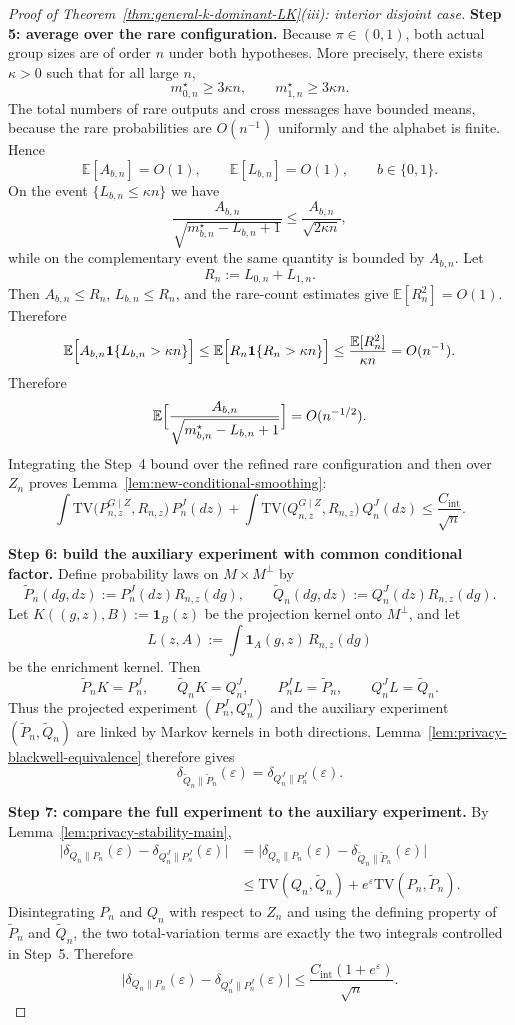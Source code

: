 \documentclass{article}
\newcommand{\TV}{\mathrm{TV}}
\newcommand{\E}{\mathbb E}
\newcommand{\1}{\mathbf 1}
\begin{document}
\begin{proof}[Proof of Theorem~\ref{thm:general-k-dominant-LK}(iii): interior disjoint case]
\medskip
\textbf{Step 5: average over the rare configuration.}
Because $\pi\in(0,1)$, both actual group sizes are of order $n$ under both hypotheses. More precisely, there exists
$\kappa>0$ such that for all large $n$,
\[
m_{0,n}^\star\ge 3\kappa n,
\qquad
m_{1,n}^\star\ge 3\kappa n.
\]
The total numbers of rare outputs and cross messages have bounded means, because the rare probabilities are
$O(n^{-1})$ uniformly and the alphabet is finite. Hence
\[
\E[A_{b,n}]=O(1),\qquad \E[L_{b,n}]=O(1),\qquad b\in\{0,1\}.
\]
On the event $\{L_{b,n}\le \kappa n\}$ we have
\[
\frac{A_{b,n}}{\sqrt{m_{b,n}^\star-L_{b,n}+1}}
\le \frac{A_{b,n}}{\sqrt{2\kappa n}},
\]
while on the complementary event the same quantity is bounded by $A_{b,n}$. Let
\[
R_n:=L_{0,n}+L_{1,n}.
\]
Then $A_{b,n}\le R_n$, $L_{b,n}\le R_n$, and the rare-count estimates give $\E[R_n^2]=O(1)$. Therefore
\[
\E\Bigl[A_{b,n}\1\{L_{b,n}>\kappa n\}\Bigr]
\le
\E\Bigl[R_n\1\{R_n>\kappa n\}\Bigr]
\le
\frac{\E[R_n^2]}{\kappa n}
=O(n^{-1}).
\]
Therefore
\[
\E\Bigl[\frac{A_{b,n}}{\sqrt{m_{b,n}^\star-L_{b,n}+1}}\Bigr]=O(n^{-1/2}).
\]
Integrating the Step~4 bound over the refined rare configuration and then over $Z_n$ proves
Lemma~\ref{lem:new-conditional-smoothing}:
\[
\int \TV\bigl(P_{n,z}^{G\mid Z},R_{n,z}\bigr)\,P_n^J(dz)
+
\int \TV\bigl(Q_{n,z}^{G\mid Z},R_{n,z}\bigr)\,Q_n^J(dz)
\le \frac{C_{\mathrm{int}}}{\sqrt n}.
\]

\medskip
\textbf{Step 6: build the auxiliary experiment with common conditional factor.}
Define probability laws on $M\times M^\perp$ by
\[
\widetilde P_n(dg,dz):=P_n^J(dz)R_{n,z}(dg),
\qquad
\widetilde Q_n(dg,dz):=Q_n^J(dz)R_{n,z}(dg).
\]
Let $K((g,z),B):=\1_B(z)$ be the projection kernel onto $M^\perp$, and let
\[
L(z,A):=\int \1_A(g,z)\,R_{n,z}(dg)
\]
be the enrichment kernel. Then
\[
\widetilde P_nK=P_n^J,
\qquad \widetilde Q_nK=Q_n^J,
\qquad P_n^J L=\widetilde P_n,
\qquad Q_n^J L=\widetilde Q_n.
\]
Thus the projected experiment $(P_n^J,Q_n^J)$ and the auxiliary experiment
$(\widetilde P_n,\widetilde Q_n)$ are linked by Markov kernels in both directions. Lemma~\ref{lem:privacy-blackwell-equivalence}
therefore gives
\[
\delta_{\widetilde Q_n\|\widetilde P_n}(\varepsilon)=\delta_{Q_n^J\|P_n^J}(\varepsilon).
\]

\medskip
\textbf{Step 7: compare the full experiment to the auxiliary experiment.}
By Lemma~\ref{lem:privacy-stability-main},
\begin{align*}
\bigl|\delta_{Q_n\|P_n}(\varepsilon)-\delta_{Q_n^J\|P_n^J}(\varepsilon)\bigr|
&=
\bigl|\delta_{Q_n\|P_n}(\varepsilon)-\delta_{\widetilde Q_n\|\widetilde P_n}(\varepsilon)\bigr| \\
&\le
\TV(Q_n,\widetilde Q_n)+e^\varepsilon\TV(P_n,\widetilde P_n).
\end{align*}
Disintegrating $P_n$ and $Q_n$ with respect to $Z_n$ and using the defining property of $\widetilde P_n$ and
$\widetilde Q_n$, the two total-variation terms are exactly the two integrals controlled in Step~5. Therefore
\[
\bigl|\delta_{Q_n\|P_n}(\varepsilon)-\delta_{Q_n^J\|P_n^J}(\varepsilon)\bigr|
\le \frac{C_{\mathrm{int}}(1+e^\varepsilon)}{\sqrt n}.
\]


\end{proof}
\end{document}
